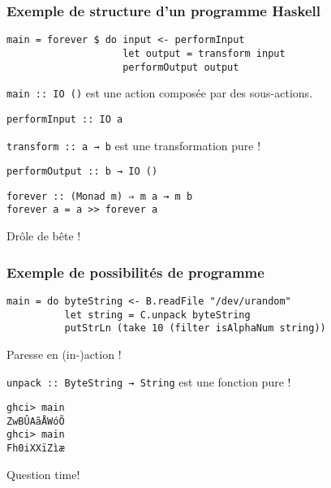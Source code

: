 \documentclass[10pt]{beamer}
\begin{document}
\begin{frame}[fragile]
\frametitle{Exemple de structure d'un programme Haskell}
\begin{verbatim}
main = forever $ do input <- performInput
                    let output = transform input
                    performOutput output
\end{verbatim}

\verb|main :: IO ()| est une action composée par des sous-actions.

\verb|performInput :: IO a|

\verb|transform :: a → b| est une transformation pure !

\verb|performOutput :: b → IO ()|

\pause

\begin{verbatim}
forever :: (Monad m) ⇒ m a → m b
forever a = a >> forever a
\end{verbatim}

Drôle de bête !

\end{frame}



\begin{frame}[fragile]
\frametitle{Exemple de possibilités de programme}
\begin{verbatim}
main = do byteString <- B.readFile "/dev/urandom"
          let string = C.unpack byteString
          putStrLn (take 10 (filter isAlphaNum string))
\end{verbatim}

Paresse en (in-)action !

\verb|unpack :: ByteString → String| est une fonction pure !

\begin{verbatim}
ghci> main
ZwBÛAãÅWóÕ
ghci> main
Fh0iXXïZìæ
\end{verbatim}
\end{frame}



\begin{frame}
\centerline{Question time!}
\end{frame}
\end{document}
